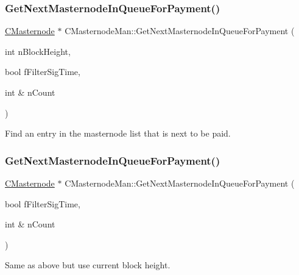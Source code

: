 \subsubsection{\texorpdfstring{Get\+Next\+Masternode\+In\+Queue\+For\+Payment()}{GetNextMasternodeInQueueForPayment()}\hspace{0.1cm}{\footnotesize\ttfamily [1/2]}}
{\footnotesize\ttfamily \mbox{\hyperlink{class_c_masternode}{C\+Masternode}} $\ast$ C\+Masternode\+Man\+::\+Get\+Next\+Masternode\+In\+Queue\+For\+Payment (\begin{DoxyParamCaption}\item[{int}]{n\+Block\+Height,  }\item[{bool}]{f\+Filter\+Sig\+Time,  }\item[{int \&}]{n\+Count }\end{DoxyParamCaption})}



Find an entry in the masternode list that is next to be paid. 

\mbox{\label{class_c_masternode_man_ae1426198b7debf7f22d228e6fe9edbc3}} 
\subsubsection{\texorpdfstring{Get\+Next\+Masternode\+In\+Queue\+For\+Payment()}{GetNextMasternodeInQueueForPayment()}\hspace{0.1cm}{\footnotesize\ttfamily [2/2]}}
{\footnotesize\ttfamily \mbox{\hyperlink{class_c_masternode}{C\+Masternode}} $\ast$ C\+Masternode\+Man\+::\+Get\+Next\+Masternode\+In\+Queue\+For\+Payment (\begin{DoxyParamCaption}\item[{bool}]{f\+Filter\+Sig\+Time,  }\item[{int \&}]{n\+Count }\end{DoxyParamCaption})}



Same as above but use current block height. 

\mbox{\label{class_c_masternode_man_ae0a0e09afbf8c3935b85c1d0a141c23d}} 

